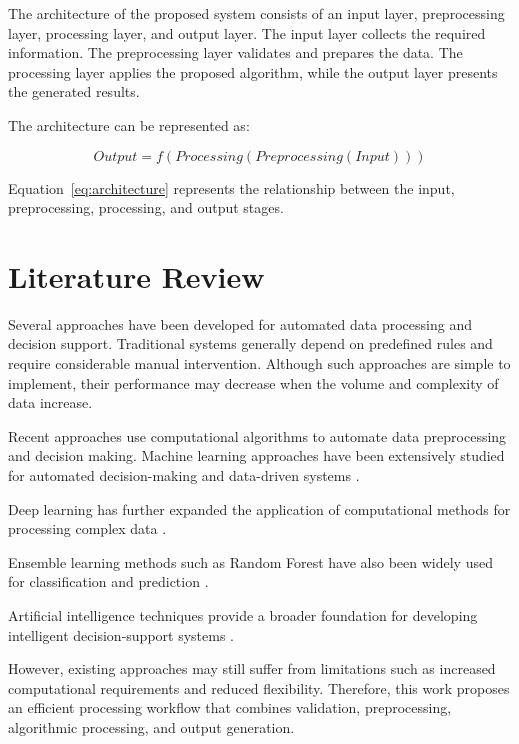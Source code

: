 \documentclass[conference]{IEEEtran}
\begin{document}
The architecture of the proposed system consists of an input
layer, preprocessing layer, processing layer, and output
layer. The input layer collects the required information.
The preprocessing layer validates and prepares the data.
The processing layer applies the proposed algorithm, while
the output layer presents the generated results.

The architecture can be represented as:

\begin{equation}
Output = f(Processing(Preprocessing(Input)))
\label{eq:architecture}
\end{equation}

Equation~\ref{eq:architecture} represents the relationship
between the input, preprocessing, processing, and output
stages.


\section{Literature Review}

Several approaches have been developed for automated data
processing and decision support. Traditional systems generally
depend on predefined rules and require considerable manual
intervention. Although such approaches are simple to
implement, their performance may decrease when the volume
and complexity of data increase.

Recent approaches use computational algorithms to automate
data preprocessing and decision making. Machine learning
approaches have been extensively studied for automated
decision-making and data-driven systems \cite{mitchell1997}.

Deep learning has further expanded the application of
computational methods for processing complex data
\cite{lecun2015}.

Ensemble learning methods such as Random Forest have also
been widely used for classification and prediction
\cite{breiman2001}.

Artificial intelligence techniques provide a broader
foundation for developing intelligent decision-support
systems \cite{russell2010}.

However, existing approaches may still suffer from limitations
such as increased computational requirements and reduced
flexibility. Therefore, this work proposes an efficient
processing workflow that combines validation, preprocessing,
algorithmic processing, and output generation.
\end{document}
